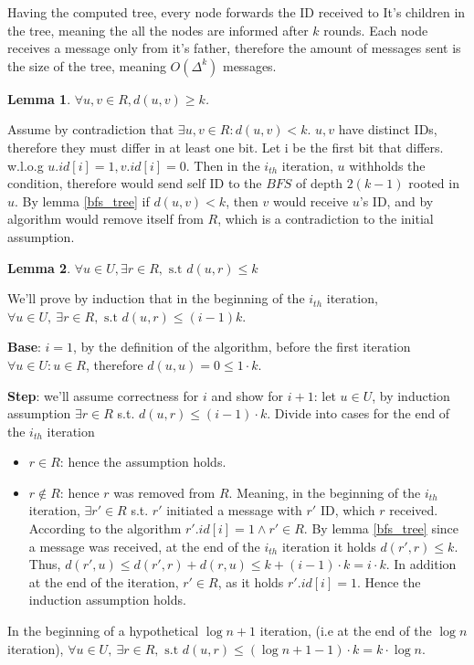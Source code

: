 \documentclass[11pt]{article}
\newtheorem{lemma}{Lemma}
\begin{document}
Having the computed tree, every node forwards the ID received to It's children in the tree, meaning the all the nodes are informed after $k$ rounds. Each node receives a message only from it's father, therefore the amount of messages sent is the size of the tree, meaning $O(\Delta^k)$ messages.

\begin{lemma}
\label{alpha_rule}
$\forall u,v \in R, d(u,v) \ge k$.
\end{lemma}
Assume by contradiction that $\exists u,v\in R: d(u,v)<k$.
$u,v$ have distinct IDs, therefore they must differ in at least one bit. Let i be the first bit that differs. w.l.o.g $u.id[i]=1, v.id[i]=0$. Then in the $i_{th}$ iteration, $u$ withholds the condition, therefore would send self ID to the $BFS$ of depth $2(k-1)$ rooted in $u$. By lemma \ref{bfs_tree} if $d(u,v)<k$, then $v$ would receive $u$'s ID, and by algorithm would remove itself from $R$, which is a contradiction to the initial assumption.

\begin{lemma}
\label{beta_rule}
$\forall u\in U,\exists r\in R, \text{ s.t } d(u,r) \le k$
\end{lemma}
We'll prove by induction that in the beginning of the $i_{th}$ iteration, $\forall u \in U,\: \exists r\in R, \text{ s.t } d(u,r) \le (i-1)k$.

\textbf{Base}: $i=1$, by the definition of the algorithm, before the first iteration $\forall u\in U: u\in R$, therefore $d(u,u)=0\le 1 \cdot k$.


\textbf{Step}: we’ll assume correctness for $i$ and show for $i+1$:
let $u\in U$, by induction assumption $\exists r\in R$ s.t. $d(u,r)\le (i-1)\cdot k$. Divide into cases for the end of the $i_{th}$ iteration
\begin{itemize}
    \item $r\in R$: hence the assumption holds.
    \item $r \notin R$: hence $r$ was removed from $R$. Meaning, in the beginning of the $i_{th}$ iteration, $\exists r'\in R$ s.t. $r'$ initiated a message with $r'$ ID, which $r$ received. According to the algorithm $r'.id[i]=1 \land r'\in R$. By lemma \ref{bfs_tree} since a message was received, at the end of the $i_{th}$ iteration it holds $d(r',r)\le k$. Thus, $d(r',u)\le d(r',r)+d(r,u)\le k+(i-1)\cdot k=i\cdot k$. In addition at the end of the iteration, $r' \in R$, as it holds $r'.id[i]=1$. Hence the induction assumption holds.
\end{itemize}
In the beginning of a hypothetical $\log{n}+1$ iteration, (i.e at the end of the $\log{n}$ iteration), $\forall u\in U, \: \exists r\in R, \text{ s.t } d(u,r) \le (\log{n}+1-1)\cdot k = k\cdot\log{n}$.
\end{document}
